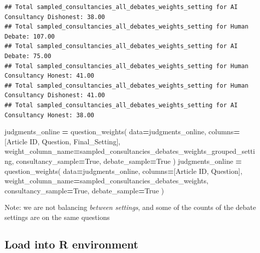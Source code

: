 \documentclass[
]{article}
\newenvironment{Shaded}{\begin{snugshade}}{\end{snugshade}}
\newcommand{\NormalTok}[1]{#1}
\newcommand{\OperatorTok}[1]{\textcolor[rgb]{0.81,0.36,0.00}{\textbf{#1}}}
\newcommand{\StringTok}[1]{\textcolor[rgb]{0.31,0.60,0.02}{#1}}
\newcommand{\VariableTok}[1]{\textcolor[rgb]{0.00,0.00,0.00}{#1}}
\begin{document}
\begin{verbatim}
## Total sampled_consultancies_all_debates_weights_setting for AI Consultancy Dishonest: 38.00
## Total sampled_consultancies_all_debates_weights_setting for Human Debate: 107.00
## Total sampled_consultancies_all_debates_weights_setting for AI Debate: 75.00
## Total sampled_consultancies_all_debates_weights_setting for Human Consultancy Honest: 41.00
## Total sampled_consultancies_all_debates_weights_setting for Human Consultancy Dishonest: 41.00
## Total sampled_consultancies_all_debates_weights_setting for AI Consultancy Honest: 38.00
\end{verbatim}

\begin{Shaded}
\begin{Highlighting}[]

\NormalTok{judgments\_online }\OperatorTok{=}\NormalTok{ question\_weights(}
\NormalTok{    data}\OperatorTok{=}\NormalTok{judgments\_online, }
\NormalTok{    columns}\OperatorTok{=}\NormalTok{[}\StringTok{\textquotesingle{}Article ID\textquotesingle{}}\NormalTok{, }\StringTok{\textquotesingle{}Question\textquotesingle{}}\NormalTok{, }\StringTok{\textquotesingle{}Final\_Setting\textquotesingle{}}\NormalTok{], }
\NormalTok{    weight\_column\_name}\OperatorTok{=}\StringTok{\textquotesingle{}sampled\_consultancies\_debates\_weights\_grouped\_setting\textquotesingle{}}\NormalTok{,}
\NormalTok{    consultancy\_sample}\OperatorTok{=}\VariableTok{True}\NormalTok{,}
\NormalTok{    debate\_sample}\OperatorTok{=}\VariableTok{True}
\NormalTok{)}
\NormalTok{judgments\_online }\OperatorTok{=}\NormalTok{ question\_weights(}
\NormalTok{    data}\OperatorTok{=}\NormalTok{judgments\_online, }
\NormalTok{    columns}\OperatorTok{=}\NormalTok{[}\StringTok{\textquotesingle{}Article ID\textquotesingle{}}\NormalTok{, }\StringTok{\textquotesingle{}Question\textquotesingle{}}\NormalTok{], }
\NormalTok{    weight\_column\_name}\OperatorTok{=}\StringTok{\textquotesingle{}sampled\_consultancies\_debates\_weights\textquotesingle{}}\NormalTok{,}
\NormalTok{    consultancy\_sample}\OperatorTok{=}\VariableTok{True}\NormalTok{,}
\NormalTok{    debate\_sample}\OperatorTok{=}\VariableTok{True}
\NormalTok{)}
\end{Highlighting}
\end{Shaded}

Note: we are not balancing \emph{between settings}, and some of the
counts of the debate settings are on the same questions

\subsection{Load into R environment}\label{load-into-r-environment}
\end{document}
